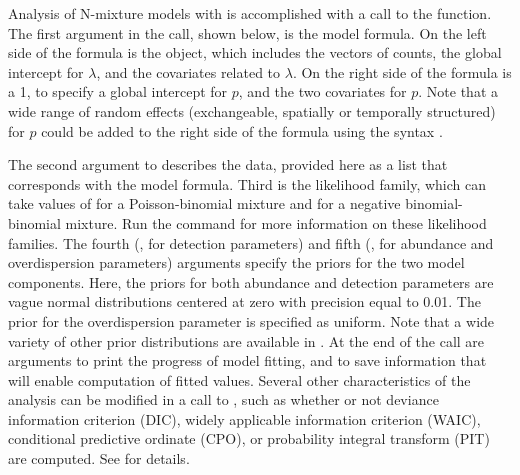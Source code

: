 \documentclass[codesnippet]{jss}
\begin{document}
Analysis of N-mixture models with  is accomplished with a call to the  function. The first argument in the  call, shown below, is the model formula. On the left side of the formula is the  object, which includes the vectors of counts, the global intercept for $\lambda$, and the covariates related to $\lambda$. On the right side of the formula is a 1, to specify a global intercept for $p$, and the two covariates for $p$. Note that a wide range of random effects (exchangeable, spatially or temporally structured) for $p$ could be added to the right side of the formula using the  syntax \citep{Rue_Riebler_Sorbye_Illian_Simpson_Lindgren_2017}.

The second argument to  describes the data, provided here as a list that corresponds with the model formula. Third is the likelihood family, which can take values of  for a Poisson-binomial mixture and  for a negative binomial-binomial mixture. Run the command  for more information on these likelihood families. The fourth (, for detection parameters) and fifth (, for abundance and overdispersion parameters) arguments specify the priors for the two model components. Here, the priors for both abundance and detection parameters are vague normal distributions centered at zero with precision equal to 0.01. The prior for the overdispersion parameter is specified as uniform. Note that a wide variety of other prior distributions are available in . At the end of the call are arguments to print the progress of model fitting, and to save information that will enable computation of fitted values. Several other characteristics of the analysis can be modified in a call to , such as whether or not deviance information criterion (DIC), widely applicable information criterion (WAIC), conditional predictive ordinate (CPO), or probability integral transform (PIT) are computed. See \cite{Rue_Riebler_Sorbye_Illian_Simpson_Lindgren_2017} for details.
\end{document}
